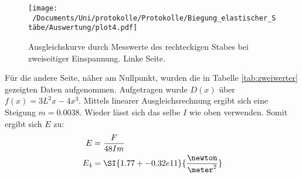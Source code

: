 \begin{figure}
  \centering
  \texttt{[image: ~/Documents/Uni/protokolle/Protokolle/Biegung\_elastischer\_Stäbe/Auswertung/plot4.pdf]}
  \caption{Ausgleichskurve durch Messwerte des rechteckigen Stabes bei zweiseitiger Einspannung. Linke Seite.}
  \label{fig:kurveRechtlinks}
\end{figure}

Für die andere Seite, näher am Nullpunkt, wurden die in Tabelle \ref{tab:zweiwerter} gezeigten Daten aufgenommen. Aufgetragen wurde $D(x)$ über $f(x)=3L^2x-4x^3$.
Mittels linearer Ausgleichsrechnung ergibt sich eine Steigung $m=\num{0.0038}$. Wieder lässt sich das selbe $I$ wie oben verwenden. Somit ergibt sich $E$ zu:
\begin{align*}
  E   &= \frac{F}{48Im} \\
  E_4 &= \SI{1.77+-0.32e11}{\frac{\newton}{\meter^2}} \\
\end{align*}

